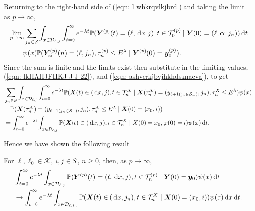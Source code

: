Returning to the right-hand side of (\ref{eqn: l whkrqvlkjbrd}) and taking the limit as \(p\to\infty\), 
\begin{align}
	&\lim_{p\to\infty} \sum_{j_n\in\mathcal S}
	\int_{x\in\mathcal{D}_{\ell,j}} \int_{t=0}^\infty e^{-\lambda t} \mathbb P({\boldsymbol Y}^{(p)}(t) = (\ell,\, \mathrm{d} x, j), 
	t\in\mathcal T_0^{(p)} \mid \nonumber 
	 \boldsymbol Y(0) = (\ell,\boldsymbol\alpha,j_n))\, \mathrm{d} t 
	 \\&\qquad{}\psi(x)  \mathbb P(\bm{Y}_{\bm{\alpha}}^{(p)}(n) = (\ell, j_n), \tau_{n}^{(p)}\leq E^\lambda 
	 \mid \boldsymbol Y^{(p)}(0)=\boldsymbol y_0^{(p)}).\label{eqn: eieieie}
\end{align}
Since the sum is finite and the limits exist then substitute in the limiting values, (\ref{eqn: lkHAHJFHKJ J J 22}), and (\ref{eqn: ashverkjbvjhkhdsknacva}), to get 
\begin{align}
	 &\sum_{j_n\in\mathcal S}\int_{x\in\mathcal{D}_{\ell,j}} \int_{t=0}^\infty e^{-\lambda t} \mathbb P(\boldsymbol X(t)\in(\, \mathrm{d} x, j), t\in\mathcal T_n^{X} \mid \boldsymbol X(\tau_n^X) = (y_{\ell+1(j_n\in\mathcal S_-)}, j_n),\nonumber 
	 \tau_n^X\leq E^\lambda ) \psi(x)
	 \\&\quad{} \mathbb P(\boldsymbol X(\tau_n^X) = (y_{\ell+1(j_{n}\in\mathcal S_-)}, 
		j_n), \tau_{n}^X\leq E^\lambda
		\mid \boldsymbol X(0)=(x_0,i))\nonumber
	\\&= \int_{t=0}^\infty e^{-\lambda t}  \int_{x\in\mathcal{D}_{\ell,j}}\mathbb P(\boldsymbol X(t)\in(\, \mathrm{d} x, j), t\in\mathcal T_n^{X} 
	\mid X(0)=x_0, \varphi(0)=i)\psi(x)\, \mathrm{d} t.
\end{align}

Hence we have shown the following result 
\begin{lem}\label{lem: LAkAKFnvnb mav h}
	For \(\ell,\ell_0\in\mathcal K\), \(i,j\in\mathcal{S}\), \(n\geq 0\), then, as \(p\to\infty\), 
	\begin{align} 
		&\int_{t=0}^\infty e^{-\lambda t}\int_{x\in\mathcal{D}_{\ell,j}}\mathbb P({\boldsymbol Y}^{(p)}(t) = (\ell,\, \mathrm{d} x, j), t\in\mathcal T_n^{(p)} \mid  \nonumber 
		\boldsymbol Y(0) = \boldsymbol y_0)\psi(x)\, \mathrm{d} t \nonumber
		\\&\to\int_{t=0}^\infty e^{-\lambda t}  \int_{x\in\mathcal{D}_{\ell,j_n}}\mathbb P(\boldsymbol X(t)\in(\, \mathrm{d} x, j_n), t\in\mathcal T_n^{X} 
		\mid \boldsymbol X(0)=(x_0,i))\psi(x)\, \mathrm{d} x\, \mathrm{d} t.
	\end{align}
\end{lem}

